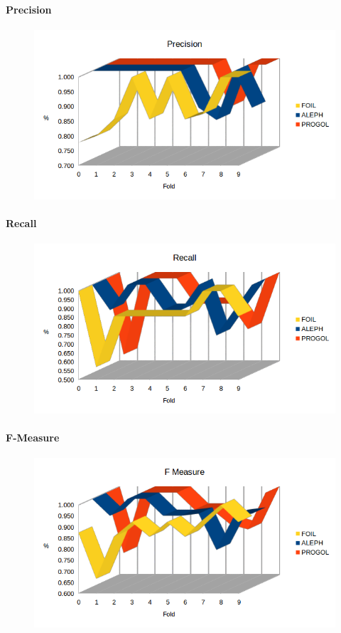 \paragraph{Precision}
\begin{figure}[H]
	\includegraphics[width=1.1\textwidth]{img/datasetGraph/svln/precision.png}
	\label{svln-Precision}
\end{figure}
\paragraph{Recall}
\begin{figure}[H]
	\includegraphics[width=1.1\textwidth]{img/datasetGraph/svln/recall.png}
	\label{svln-Recall}
\end{figure}
\paragraph{F-Measure}
\begin{figure}[H]
	\includegraphics[width=1.1\textwidth]{img/datasetGraph/svln/fm.png}
	\label{svln-F-measure}
\end{figure}
